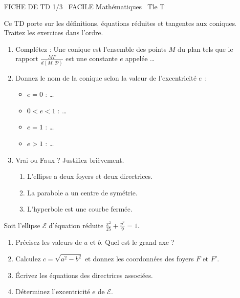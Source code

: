 \documentclass[11pt]{article}
\begin{document}
\begin{tcolorbox}[enhanced,colback=popink,colframe=popink,arc=10pt,boxrule=0pt,left=12pt,right=12pt,top=9pt,bottom=9pt]
{\color{white}\popxbold\small FICHE DE TD 1/3 \textbullet\ FACILE \hfill Mathématiques \textbullet\ Tle T\par}
\end{tcolorbox}
\vspace{4pt}
Ce TD porte sur les définitions, équations réduites et tangentes aux coniques. Traitez les exercices dans l'ordre.

\begin{exercice}
\begin{enumerate}
    \item Complétez : Une conique est l'ensemble des points $M$ du plan tels que le rapport $\frac{MF}{d(M, \mathcal{D})}$ est une constante $e$ appelée \ldots
    \item Donnez le nom de la conique selon la valeur de l'excentricité $e$ :
    \begin{itemize}
        \item $e = 0$ : \ldots
        \item $0 < e < 1$ : \ldots
        \item $e = 1$ : \ldots
        \item $e > 1$ : \ldots
    \end{itemize}
    \item Vrai ou Faux ? Justifiez brièvement.
    \begin{enumerate}
        \item L'ellipse a deux foyers et deux directrices.
        \item La parabole a un centre de symétrie.
        \item L'hyperbole est une courbe fermée.
    \end{enumerate}
\end{enumerate}
\end{exercice}

\begin{exercice}
Soit l'ellipse $\mathcal{E}$ d'équation réduite $\frac{x^2}{25} + \frac{y^2}{9} = 1$.
\begin{enumerate}
    \item Précisez les valeurs de $a$ et $b$. Quel est le grand axe ?
    \item Calculez $c = \sqrt{a^2 - b^2}$ et donnez les coordonnées des foyers $F$ et $F'$.
    \item Écrivez les équations des directrices associées.
    \item Déterminez l'excentricité $e$ de $\mathcal{E}$.
\end{enumerate}
\end{exercice}
\end{document}
